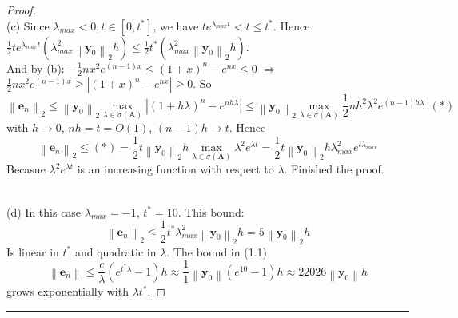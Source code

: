 \documentclass[a4paper, 10pt]{article}
\theoremstyle{definition}
\theoremstyle{hSol}
\begin{document}
\begin{proof}
~\\
(c) Since $\lambda_{max} < 0, t\in[0,t^*]$, we have $te^{\lambda_{max} t} < t \leq t^*$. Hence $\frac{1}{2}te^{\lambda_{max} t} (\lambda_{max}^2 \left\|\bm{y}_0\right\|_2h) \leq \frac{1}{2}t^* (\lambda_{max}^2 \left\|\bm{y}_0\right\|_2h)$. \\
And by (b): $-\frac{1}{2}nx^2 e^{(n-1)x}\leq (1+x)^n-e^{nx} \leq 0$ $\Rightarrow$ $\frac{1}{2}nx^2 e^{(n-1)x}\geq |(1+x)^n-e^{nx}| \geq 0$. So
\begin{equation}
  \left\|\bm{e}_n\right\|_2 \leq \left\|\bm{y}_0\right\|_2 \max\limits_{\lambda\in \sigma(\bm{A})}\left|(1+h \lambda)^n - e^{nh \lambda}\right| \leq \left\|\bm{y}_0\right\|_2 \max\limits_{\lambda\in \sigma(\bm{A})}\frac{1}{2}nh^2\lambda^2 e^{(n-1)h \lambda}~~(*)
\end{equation}
with $h\to 0$, $nh=t=O(1)$, $(n-1)h\to t$. Hence
\begin{equation}
  \left\|\bm{e}_n \right\|_2 \leq (*) = \frac{1}{2}t\left\|\bm{y}_0\right\|_2h \max\limits_{\lambda\in \sigma(\bm{A})}\lambda^2 e^{\lambda t} = \frac{1}{2}t\left\|\bm{y}_0\right\|_2h\lambda_{max}^2 e^{t \lambda_{max}}
\end{equation}
Becasue $\lambda^2 e^{\lambda t}$ is an increasing function with respect to $\lambda$. Finished the proof.

~\\
(d) In this case $\lambda_{max}=-1$, $t^* = 10$. This bound:
$$
\left\|\bm{e}_n \right\|_2 \leq \frac{1}{2} t^* \lambda_{max}^2 \left\|\bm{y}_0\right\|_2 h = 5 \left\|\bm{y}_0 \right\|_2 h
$$
Is linear in $t^*$ and quadratic in $\lambda$.
The bound in (1.1)
$$
\left\|\bm{e}_n\right\| \leq \frac{c}{\lambda} (e^{t^* \lambda} - 1)h \approx \frac{1}{1} \left\|\bm{y}_0\right\|(e^{10}-1)h \approx 22026 \left\|\bm{y}_0\right\| h
$$
grows exponentially with $\lambda t^*$.



\end{proof} 






\noindent\rule{16cm}{0.4pt}
\end{document}
